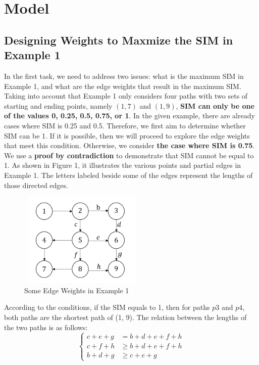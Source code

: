 \section{Model}

\subsection{Designing Weights to Maxmize the SIM in Example 1}

\indent \indent In the first task, we need to address two issues: what is the maximum SIM in Example 1, and what are the edge weights that result in the maximum SIM. Taking into account that Example 1 only considers four paths with two sets of starting and ending points, namely $(1,7)$ and $(1,9)$, \textbf{SIM can only be one of the values 0, 0.25, 0.5, 0.75, or 1}. In the given example, there are already cases where SIM is 0.25 and 0.5. Therefore, we first aim to determine whether SIM can be 1. If it is possible, then we will proceed to explore the edge weights that meet this condition. Otherwise, we consider \textbf{the case where SIM is 0.75}.\\
\indent We use a \textbf{proof by contradiction} to demonstrate that SIM cannot be equal to 1. As shown in Figure 1, it illustrates the various points and partial edges in Example 1. The letters labeled beside some of the edges represent the lengths of those directed edges. \\
\begin{figure}[H]
    \centering
    \includegraphics[width=6cm,height=4.5cm]{example1题图.png}
    \caption{Some Edge Weights in Example 1}
\end{figure}
\indent According to the conditions, if the SIM equals to 1, then for paths $p3$ and $p4$, both paths are the shortest path of (1, 9). The relation between the lengths of the two paths is as follows:
\[
\left\{
\begin{aligned}
    c+e+g&=b+d+e+f+h\\
    c+f+h &\geq b+d+e+f+h\\
    b+d+g &\geq c+e+g
\end{aligned}
\right.
\]
